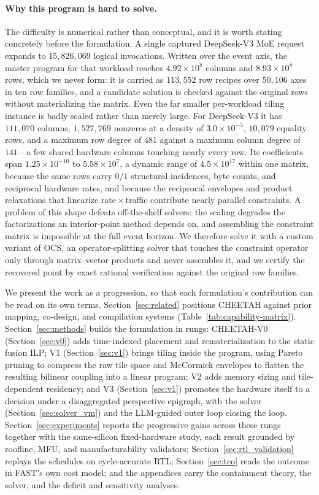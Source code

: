 \paragraph{Why this program is hard to solve.}
The difficulty is numerical rather than conceptual, and it is worth stating
concretely before the formulation. A single captured DeepSeek-V3 MoE request
expands to $15{,}826{,}069$ logical invocations. Written over the event axis,
the master program for that workload reaches $4.92\times10^{8}$ columns and
$8.93\times10^{8}$ rows, which we never form: it is carried as $113{,}552$ row
recipes over $50{,}106$ axes in ten row families, and a candidate solution is
checked against the original rows without materializing the matrix. Even the
far smaller per-workload tiling instance is badly scaled rather than merely
large. For DeepSeek-V3 it has $111{,}070$ columns, $1{,}527{,}769$ nonzeros at
a density of $3.0\times10^{-5}$, $10{,}079$ equality rows, and a maximum row
degree of $481$ against a maximum column degree of $141$---a few shared
hardware columns touching nearly every row. Its coefficients span
$1.25\times10^{-10}$ to $5.58\times10^{7}$, a dynamic range of
$4.5\times10^{17}$ within one matrix, because the same rows carry $0/1$
structural incidences, byte counts, and reciprocal hardware rates, and because
the reciprocal envelopes and product relaxations that linearize
rate\,$\times$\,traffic contribute nearly parallel constraints. A problem of
this shape defeats off-the-shelf solvers: the scaling degrades the
factorizations an interior-point method depends on, and assembling the
constraint matrix is impossible at the full event horizon. We therefore solve
it with a custom variant of OCS, an operator-splitting solver that touches the
constraint operator only through matrix--vector products and never assembles
it, and we certify the recovered point by exact rational verification against
the original row families.

We present the work as a progression, so that each formulation's contribution can be read on its own terms. Section~\ref{sec:related} positions CHEETAH against prior mapping, co-design, and compilation systems (Table~\ref{tab:capability-matrix}). Section~\ref{sec:methods} builds the formulation in rungs: CHEETAH-V0 (Section~\ref{sec:v0}) adds time-indexed placement and rematerialization to the static fusion ILP; V1 (Section~\ref{sec:v1}) brings tiling inside the program, using Pareto pruning to compress the raw tile space and McCormick envelopes to flatten the resulting bilinear coupling into a linear program; V2 adds memory sizing and tile-dependent residency; and V3 (Section~\ref{sec:v1}) promotes the hardware itself to a decision under a disaggregated perspective epigraph, with the solver (Section~\ref{sec:solver_vm}) and the LLM-guided outer loop closing the loop. Section~\ref{sec:experiments} reports the progressive gains across these rungs together with the same-silicon fixed-hardware study, each result grounded by roofline, MFU, and manufacturability validators; Section~\ref{sec:rtl_validation} replays the schedules on cycle-accurate RTL; Section~\ref{sec:tco} reads the outcome in FAST's own cost model; and the appendices carry the containment theory, the solver, and the deficit and sensitivity analyses.

